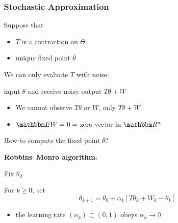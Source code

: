 \documentclass[xcolor=dvipsnames]{beamer}  %
\renewcommand{\geq}{\geqslant}
\newcommand{\emp}[1]{\textcolor{DarkOrange1}{\bf #1}}
\newcommand{\1}{\mathbbm 1}
\newcommand{\RR}{\mathbbm R}
\newcommand{\EE}{\mathbbm E}
\begin{document}
\begin{frame}
    \frametitle{Stochastic Approximation}

    Suppose that

    \begin{itemize}
        \item $T$ is a contraction on $\Theta$
        \vspace{0.5em}
        \item unique fixed point $\bar \theta$
    \end{itemize}

    We can only evaluate $T$ with noise:
    \begin{center}
        input $\theta$ and receive noisy output $T \theta + W$ 
    \end{center}

    \vspace{1em}
    \begin{itemize}
        \item We cannot observe $T\theta$ or $W$, only $T \theta + W$
    \vspace{0.5em}
        \item $\EE W = 0 =$ zero vector in $\RR^n$
    \end{itemize}


\end{frame}


\begin{frame}
    
    How to compute the fixed point $\bar \theta$?

    \vspace{0.5em}
    \vspace{0.5em}

    \emp{Robbins--Monro algorithm}: 

    Fix $\theta_0$ 

    For $k \geq 0$, set
    \begin{equation*}
        \theta_{k+1} 
        = \theta_k + \alpha_k [ T \theta_k + W_k - \theta_k ]
    \end{equation*}

    \begin{itemize}
        \item the learning rate $(\alpha_k) \subset (0,1)$ obeys $\alpha_k \to 0$
    \end{itemize}

\end{frame}
\end{document}
